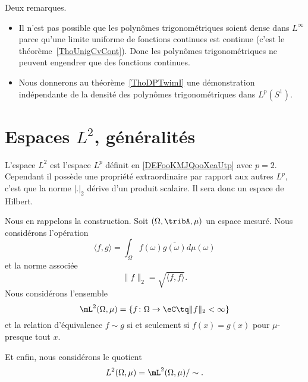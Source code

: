 \begin{remark}
    Deux remarques.
    \begin{itemize}
        \item
            Il n'est pas possible que les polynômes trigonométriques soient dense dans \( L^{\infty}\) parce qu'une limite uniforme de fonctions continues est continue (c'est le théorème~\ref{ThoUnigCvCont}). Donc les polynômes trigonométriques ne peuvent engendrer que des fonctions continues.
        \item
            Nous donnerons au théorème~\ref{ThoDPTwimI} une démonstration indépendante de la densité des polynômes trigonométriques dans \( L^p(S^1)\).
    \end{itemize}
\end{remark}

\section{Espaces \texorpdfstring{$L^2$}{$L^2$}, généralités}
\label{SECooEVZSooLtLhUm}

L'espace \( L^2\) est l'espace \( L^p\) définit en \ref{DEFooKMJQooXeaUtp} avec \( p=2\). Cependant il possède une propriété extraordinaire par rapport aux autres \( L^p\), c'est que la norme \( | . |_2\) dérive d'un produit scalaire. Il sera donc un espace de Hilbert.

\begin{normaltext}  \label{NORMooUEIEooYtlFse}
    Nous en rappelons la construction. Soit \( (\Omega,\tribA,\mu)\) un espace mesuré. Nous considérons l'opération
    \begin{equation}    \label{DefProdScalLubrgTj}
        \langle f, g\rangle =\int_{\Omega}f(\omega)\overline{ g(\omega)}d\mu(\omega)
    \end{equation}
    et la norme associée
    \begin{equation}
        \| f \|_2=\sqrt{\langle f, f\rangle }.
    \end{equation}
    Nous considérons l'ensemble
    \begin{equation}
        \mL^2(\Omega,\mu)=\{ f\colon \Omega\to \eC\tq \| f \|_2<\infty \}
    \end{equation}
    et la relation d'équivalence \( f\sim g\) si et seulement si \( f(x)=g(x)\) pour \( \mu\)-presque tout \( x\).

    Et enfin, nous considérons le quotient
    \begin{equation}
        L^2(\Omega,\mu)=\mL^2(\Omega,\mu)/\sim.
    \end{equation}
\end{normaltext}


